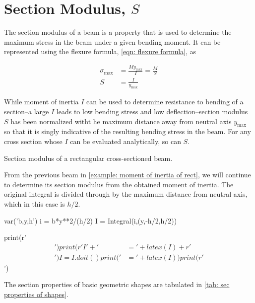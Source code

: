 \documentclass[
10pt,
a4paper,
openany,
svgnames,
]{book}
\begin{document}
\section{Section Modulus, $S$}

The section modulus of a beam is a property that is used to determine the maximum stress in the beam under a given bending moment. It can be represented using the flexure formula, \cref{eqn: flexure formula}, as

\begin{align}
  \label{eq: section modulus formula}
  \sigma_{\max} &= \frac{My_{\max}}{I} = \frac{M}{S} \nonumber \\
  S &= \frac{I}{y_{\max}}
\end{align}

While moment of inertia $I$ can be used to determine resistance to bending of a section--a large $I$ leads to low bending stress and low deflection--section modulus $S$ has been normalized witht he maximum distance away from neutral axis $y_{\max}$ so that it is singly indicative of the resulting bending stress in the beam. For any cross section whose $I$ can be evaluated analytically, so can $S$.

\begin{example} Section modulus of a rectangular cross-sectioned beam.

  From the previous beam in \cref{example: moment of inertia of rect}, we will continue to determine its section modulus from the obtained moment of inertia. The original integral is divided through by the maximum distance from neutral axis, which in this case is $h/2$. 

  \begin{sympycode}
    var('b,y,h')
    i = b*y**2/(h/2)
    I = Integral(i,(y,-h/2,h/2))

    print(r'\begin{align*}')
    print(r'I' + '&=' + latex(I) + r'\\')
    I = I.doit()
    print('&=' + latex(I))    
    print(r'\end{align*}')
  \end{sympycode}
\end{example}

The section properties of basic geometric shapes are tabulated in \cref{tab: sec properties of shapes}.
\end{document}
